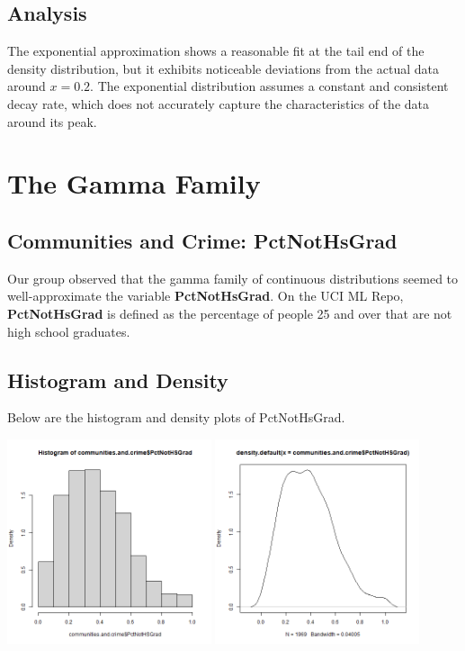 \documentclass[12pt, letterpaper]{report}
\begin{document}
\section{Analysis}
The exponential approximation shows a reasonable fit at the tail end of the density distribution, but it exhibits noticeable deviations from the actual data around \(x=0.2\).
The exponential distribution assumes a constant and consistent decay rate, which does not accurately capture the characteristics of the data around its peak.



\maketitle
\chapter{The Gamma Family}
\section{Communities and Crime: PctNotHsGrad}

Our group observed that the gamma family of continuous distributions seemed to well-approximate the variable \textbf{PctNotHsGrad}.
On the UCI ML Repo, \textbf{PctNotHsGrad} is defined as the percentage of people 25 and over that are not high school graduates.

\section{Histogram and Density}
Below are the histogram and density plots of PctNotHsGrad.
\begin{center}
\includegraphics[width=0.45\textwidth]{gamma/PctNotHsGrad_hist}
\includegraphics[width=0.45\textwidth]{gamma/PctNotHsGrad_density}
\end{center}
\end{document}
